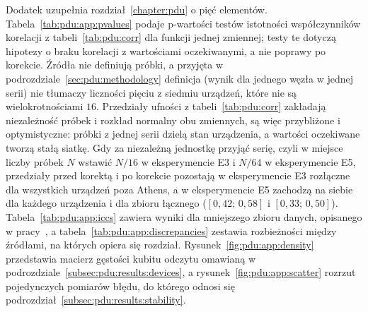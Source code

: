 Dodatek uzupełnia rozdział~\ref{chapter:pdu} o pięć elementów.
Tabela~\ref{tab:pdu:app:pvalues} podaje p-wartości testów istotności współczynników korelacji z tabeli~\ref{tab:pdu:corr} dla funkcji jednej zmiennej; testy te dotyczą hipotezy o braku korelacji z wartościami oczekiwanymi, a nie poprawy po korekcie.
Źródła nie definiują próbki, a przyjęta w podrozdziale~\ref{sec:pdu:methodology} definicja (wynik dla jednego węzła w jednej serii) nie tłumaczy liczności pięciu z siedmiu urządzeń, które nie są wielokrotnościami $16$.
Przedziały ufności z tabeli~\ref{tab:pdu:corr} zakładają niezależność próbek i rozkład normalny obu zmiennych, są więc przybliżone i optymistyczne: próbki z jednej serii dzielą stan urządzenia, a wartości oczekiwane tworzą stałą siatkę.
Gdy za niezależną jednostkę przyjąć serię, czyli w miejsce liczby próbek $N$ wstawić $N/16$ w eksperymencie E3 i $N/64$ w eksperymencie E5, przedziały przed korektą i po korekcie pozostają w eksperymencie E3 rozłączne dla wszystkich urządzeń poza Athens, a w eksperymencie E5 zachodzą na siebie dla każdego urządzenia i dla zbioru łącznego ($[0{,}42;\,0{,}58]$ i $[0{,}33;\,0{,}50]$).
Tabela~\ref{tab:pdu:app:iccs} zawiera wyniki dla mniejszego zbioru danych, opisanego w pracy~\cite{werner_experiment_driven_2022}, a tabela~\ref{tab:pdu:app:discrepancies} zestawia rozbieżności między źródłami, na których opiera się rozdział.
Rysunek~\ref{fig:pdu:app:density} przedstawia macierz gęstości kubitu odczytu omawianą w podrozdziale~\ref{subsec:pdu:results:devices}, a rysunek~\ref{fig:pdu:app:scatter} rozrzut pojedynczych pomiarów błędu, do którego odnosi się podrozdział~\ref{subsec:pdu:results:stability}.

